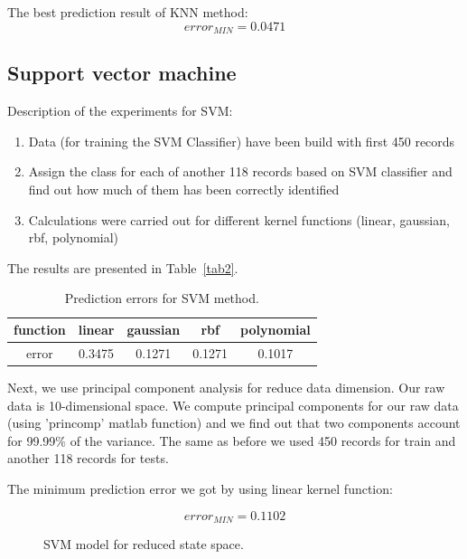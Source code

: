 \documentclass[
10pt, %
a4paper, %
oneside, %
headinclude,footinclude, %
BCOR5mm, %
]{scrartcl}
\begin{document}
The best prediction result of KNN method:
\begin{equation}
 error_{MIN} = 0.0471
\label{eq:refname2}
\end{equation}

\subsection{Support vector machine}

Description of the experiments for SVM:
\begin{enumerate}[noitemsep] %
\item Data (for training the SVM Classifier) have been build with first 450 records
\item Assign the class for each of another 118 records based on SVM classifier and find out how much of them has been correctly identified
\item Calculations were carried out for different kernel functions (linear, gaussian, rbf, polynomial)
\end{enumerate}
The results are presented in Table~\vref{tab2}.

\begin{table}[H]
	\centering
	\begin{tabular}{ c | c | c | c | c }
    function  & linear & gaussian & rbf & polynomial \\ \hline
    error & 0.3475 & 0.1271 & 0.1271 & \cellcolor{amber!25}0.1017 \\
  	\end{tabular}
  	\caption{Prediction errors for SVM method.}
  	\label{tab2}
\end{table}

Next, we use principal component analysis for reduce data dimension. Our raw data is 10-dimensional space. We compute principal components for our raw data (using 'princomp' matlab function) and we find out that two components account for 99.99$ \% $ of the variance. The same as before we used 450 records for train and another 118 records for tests.

The minimum prediction error we got by using linear kernel function:

\begin{equation}
 error_{MIN} = 0.1102
\label{eq:refname2}
\end{equation}

\begin{figure}[H]
\centering 
{}%
\caption[An example of a floating figure]{SVM model for reduced state space.} %
\label{fig:svm2} 
\end{figure}
\end{document}
